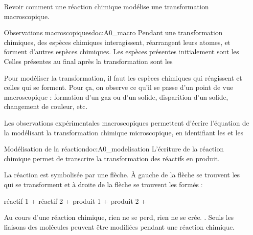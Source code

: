 \tetePremStssRedo

\vspace*{-40pt}

\begin{objectifs}
  \item Revoir comment une réaction chimique modélise une transformation macroscopique.
\end{objectifs}


\begin{doc}{Observations macroscopiques}{doc:A0_macro}
  Pendant une transformation chimiques, des espèces chimiques interagissent, réarrangent leurs atomes, et forment d'autres espèces chimiques.
  Les espèces présentes initialement sont les  Celles présentes au final après la transformation sont les 
  
  Pour modéliser la transformation, il faut  les espèces chimiques qui réagissent et celles qui se forment.
  Pour ça, on observe ce qu'il se passe d'un point de vue macroscopique : formation d'un gaz ou d'un solide, disparition d'un solide, changement de couleur, etc.
  
  \begin{importants}
    Les observations expérimentales macroscopiques permettent d'écrire l'équation de la  modélisant la transformation chimique microscopique, en identifiant les  et les 
  \end{importants}
\end{doc}

\begin{doc}{Modélisation de la réaction}{doc:A0_modelisation}
  L'écriture de la réaction chimique permet de transcrire la transformation des réactifs en produit.
  
  \begin{importants}
    La réaction est symbolisée par une flèche. À gauche de la flèche se trouvent les  qui se transforment et à droite de la flèche se trouvent les  formés :
    \begin{center}
      réactif 1 + réactif 2 +   \reaction produit 1 + produit 2 +  
    \end{center}
  \end{importants}
  
  Au cours d'une réaction chimique, rien ne se perd, rien ne se crée. .
  Seuls les liaisons des molécules peuvent être modifiées pendant une réaction chimique.
\end{doc}

